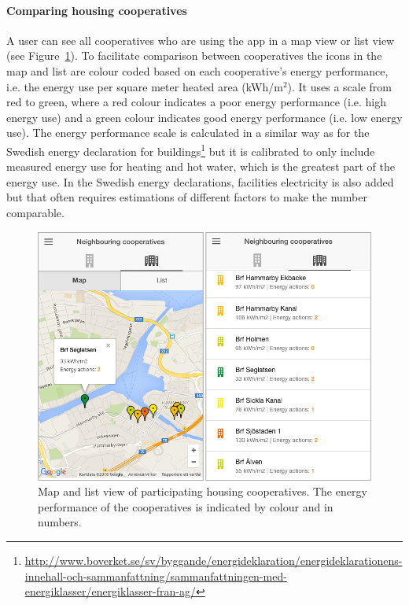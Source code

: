 \paragraph{Comparing housing cooperatives}

A user can see all cooperatives who are using the app in a map view or list view (see Figure~\ref{fig:Figure202_Housing_cooperatives_comparison}). To facilitate comparison between cooperatives the icons in the map and list are colour coded based on each cooperative's energy performance, i.e. the energy use per square meter heated area (kWh/m$^2$). It uses a scale from red to green, where a red colour indicates a poor energy performance (i.e. high energy use) and a green colour indicates good energy performance (i.e. low energy use). The energy performance scale is calculated in a similar way as for the Swedish energy declaration for buildings\footnote{\url{http://www.boverket.se/sv/byggande/energideklaration/energideklarationens-innehall-och-sammanfattning/sammanfattningen-med-energiklasser/energiklasser-fran-ag/}}  but it is calibrated to only include measured energy use for heating and hot water, which is the greatest part of the energy use. In the Swedish energy declarations, facilities electricity is also added but that often requires estimations of different factors to make the number comparable.

\begin{figure}
	\centering
	\includegraphics[width=0.9\linewidth]{img/Figure202_Housing_cooperatives_comparison.png}
	\caption{Map and list view of participating housing cooperatives. The energy performance of the cooperatives is indicated by colour and in numbers.}
	\label{fig:Figure202_Housing_cooperatives_comparison}
\end{figure}


